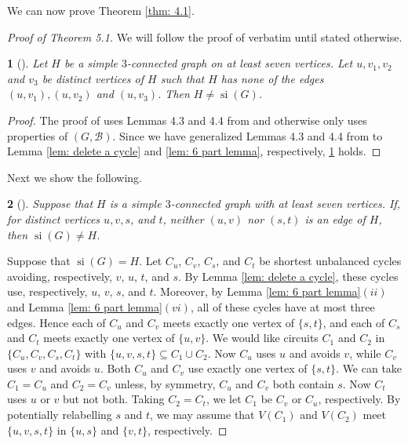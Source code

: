 \documentclass[12pt]{article}
\theoremstyle{definition}
\theoremstyle{plain} %
\newtheorem{subtheorem}{}[theorem]
\newcommand{\cB}{\mathcal{B}}
\DeclareMathOperator{\si}{si}
\begin{document}
We can now prove Theorem \ref{thm: 4.1}.


\begin{proof}[Proof of Theorem 5.1]
    We will follow the proof of \cite[Theorem 4.1]{Fife-Mayhew-Oxley-Semple2020} verbatim until stated otherwise.
    
    \begin{subtheorem}[{\cite[4.4.1]{Fife-Mayhew-Oxley-Semple2020}}]\label{H is a simple 3 connected graph on 7 vertices claw case} 
        Let $H$ be a simple $3$-connected graph on at least seven vertices. Let $u, v_1, v_2$ and $v_3$ be distinct vertices of $H$ such that $H$ has none of the edges $(u,v_1), (u,v_2)$ and $(u,v_3)$. Then $H \neq \si(G)$. 
    \end{subtheorem}
    \begin{proof}
    The proof of \cite[4.4.1]{Fife-Mayhew-Oxley-Semple2020} uses Lemmas 4.3 and 4.4 from \cite{Fife-Mayhew-Oxley-Semple2020} and otherwise only uses properties of $(G, \cB)$.
Since we have generalized Lemmas 4.3 and 4.4 from \cite{Fife-Mayhew-Oxley-Semple2020} to Lemma \ref{lem: delete a cycle} and \ref{lem: 6 part lemma}, respectively, \ref{H is a simple 3 connected graph on 7 vertices claw case} holds.
    \end{proof}
    
    Next we show the following.
    
    \begin{subtheorem}[{\cite[4.4.2]{Fife-Mayhew-Oxley-Semple2020}}] \label{H is a simple 3 connected graph on 7 vertices matching case}
        Suppose that $H$ is a simple $3$-connected graph with at least seven vertices. If, for distinct vertices $u,v,s$, and $t$, neither $(u,v)$ nor $(s,t)$ is an edge of $H$, then $\si(G) \neq H$.  
    \end{subtheorem}


Suppose that $\si(G) = H$. Let $C_u$, $C_v$, $C_s$, and $C_t$ be shortest unbalanced cycles avoiding, respectively, $v$, $u$, $t$, and $s$. By Lemma \ref{lem: delete a cycle}, these cycles use, respectively, $u$, $v$, $s$, and $t$. Moreover, by Lemma \ref{lem: 6 part lemma}$(ii)$ and Lemma \ref{lem: 6 part lemma}$(vi)$, all of these cycles have at most three edges. Hence each of $C_u$ and $C_v$ meets exactly one vertex of $\{s, t\}$, and each of $C_s$ and $C_t$ meets exactly one vertex of $\{u, v\}$. We would like circuits $C_1$ and $C_2$ in $\{C_u, C_v, C_s, C_t\}$ with $\{u, v, s, t\}\subseteq C_1\cup C_2$. Now $C_u$ uses $u$ and avoids $v$, while $C_v$ uses $v$ and avoids $u$. Both $C_u$ and $C_v$ use exactly one vertex of $\{s, t\}$. We can take $C_1= C_u$ and $C_2 = C_v$ unless, by symmetry, $C_u$ and $C_v$ both contain $s$. Now $C_t$ uses $u$ or $v$ but not both. Taking $C_2 = C_t$, we let $C_1$ be $C_v$ or $C_u$, respectively. By potentially relabelling $s$ and $t$, we may assume that $V(C_1)$ and $V(C_2)$ meet $\{u, v, s, t\}$ in $\{u, s\}$ and $\{v, t\}$, respectively. 



\end{proof}
\end{document}
